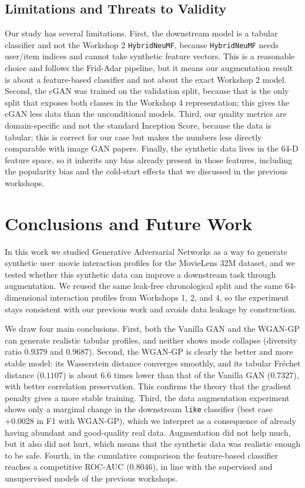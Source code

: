 \documentclass[10pt,twocolumn]{article}
\begin{document}
\subsection{Limitations and Threats to Validity}

Our study has several limitations. First, the downstream model is a tabular classifier and not
the Workshop 2 \texttt{HybridNeuMF}, because \texttt{HybridNeuMF} needs user/item indices and
cannot take synthetic feature vectors. This is a reasonable choice and follows the Frid-Adar
pipeline, but it means our augmentation result is about a feature-based classifier and not about
the exact Workshop 2 model. Second, the cGAN was trained on the validation split, because that
is the only split that exposes both classes in the Workshop 4 representation; this gives the cGAN
less data than the unconditional models. Third, our quality metrics are domain-specific and not
the standard Inception Score, because the data is tabular; this is correct for our case but makes
the numbers less directly comparable with image GAN papers. Finally, the synthetic data lives in
the 64-D feature space, so it inherits any bias already present in those features, including the
popularity bias and the cold-start effects that we discussed in the previous workshops.

\section{Conclusions and Future Work}

In this work we studied Generative Adversarial Networks as a way to generate synthetic
user--movie interaction profiles for the MovieLens 32M dataset, and we tested whether this
synthetic data can improve a downstream task through augmentation. We reused the same leak-free
chronological split and the same 64-dimensional interaction profiles from Workshops 1, 2, and 4,
so the experiment stays consistent with our previous work and avoids data leakage by
construction.

We draw four main conclusions. First, both the Vanilla GAN and the WGAN-GP can generate
realistic tabular profiles, and neither shows mode collapse (diversity ratio $0.9379$ and
$0.9687$). Second, the WGAN-GP is clearly the better and more stable model: its Wasserstein
distance converges smoothly, and its tabular Fr\'echet distance ($0.1107$) is about $6.6$ times
lower than that of the Vanilla GAN ($0.7327$), with better correlation preservation. This
confirms the theory that the gradient penalty gives a more stable training. Third, the data
augmentation experiment shows only a marginal change in the downstream \texttt{like} classifier
(best case $+0.0028$ in F1 with WGAN-GP), which we interpret as a consequence of already having
abundant and good-quality real data. Augmentation did not help much, but it also did not hurt,
which means that the synthetic data was realistic enough to be safe. Fourth, in the cumulative
comparison the feature-based classifier reaches a competitive ROC-AUC ($0.8046$), in line with
the supervised and unsupervised models of the previous workshops.
\end{document}
